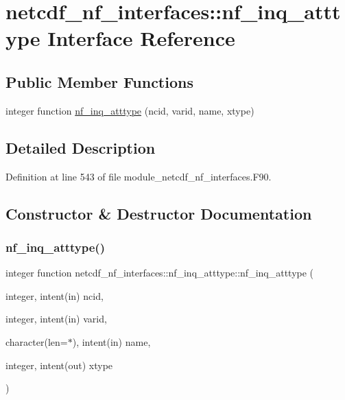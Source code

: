 \hypertarget{interfacenetcdf__nf__interfaces_1_1nf__inq__atttype}{}\section{netcdf\+\_\+nf\+\_\+interfaces\+:\+:nf\+\_\+inq\+\_\+atttype Interface Reference}
\label{interfacenetcdf__nf__interfaces_1_1nf__inq__atttype}
\subsection*{Public Member Functions}
\begin{DoxyCompactItemize}
\item 
integer function \hyperlink{interfacenetcdf__nf__interfaces_1_1nf__inq__atttype_a57218159dd37dbdeff4cae97986e57cf}{nf\+\_\+inq\+\_\+atttype} (ncid, varid, name, xtype)
\end{DoxyCompactItemize}


\subsection{Detailed Description}


Definition at line 543 of file module\+\_\+netcdf\+\_\+nf\+\_\+interfaces.\+F90.



\subsection{Constructor \& Destructor Documentation}
\mbox{\label{interfacenetcdf__nf__interfaces_1_1nf__inq__atttype_a57218159dd37dbdeff4cae97986e57cf}} 
\subsubsection{\texorpdfstring{nf\+\_\+inq\+\_\+atttype()}{nf\_inq\_atttype()}}
{\footnotesize\ttfamily integer function netcdf\+\_\+nf\+\_\+interfaces\+::nf\+\_\+inq\+\_\+atttype\+::nf\+\_\+inq\+\_\+atttype (\begin{DoxyParamCaption}\item[{integer, intent(in)}]{ncid,  }\item[{integer, intent(in)}]{varid,  }\item[{character(len=$\ast$), intent(in)}]{name,  }\item[{integer, intent(out)}]{xtype }\end{DoxyParamCaption})}



